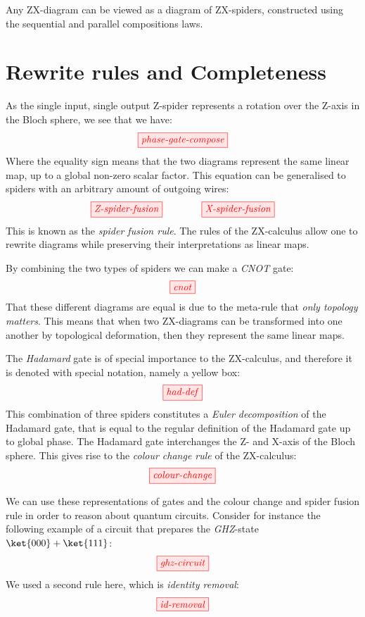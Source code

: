 \documentclass[a4paper, 12pt]{article}
\begin{document}
Any ZX-diagram can be viewed as a diagram of ZX-spiders, constructed using the
sequential and parallel compositions laws.



\section{Rewrite rules and Completeness}

As the single input, single output Z-spider represents a rotation over the Z-axis in the Bloch sphere, we see that we have:
\begin{equation*}
    \tikzfig{phase-gate-compose}
\end{equation*}
Where the equality sign means that the two diagrams represent the same linear map, up to a global non-zero scalar factor. This equation can be generalised to spiders with an arbitrary amount of outgoing wires:
\begin{equation*}
    \tikzfig{Z-spider-fusion} \qquad\qquad \tikzfig{X-spider-fusion}
\end{equation*}
This is known as the \emph{spider fusion rule}. The rules of the ZX-calculus allow one to rewrite diagrams while preserving their interpretations as linear maps.

By combining the two types of spiders we can make a \emph{CNOT} gate:
\begin{equation*}
    \tikzfig{cnot}
\end{equation*}
That these different diagrams are equal is due to the meta-rule that \emph{only topology matters}. This means that when two ZX-diagrams can be transformed into one another by topological deformation, then they represent the same linear maps.

The \emph{Hadamard} gate is of special importance to the ZX-calculus, and therefore it is denoted with special notation, namely a yellow box:
\begin{equation*}
    \tikzfig{had-def}
\end{equation*}
This combination of three spiders constitutes a \emph{Euler decomposition} of the Hadamard gate, that is equal to the regular definition of the Hadamard gate up to global phase. The Hadamard gate interchanges the Z- and X-axis of the Bloch sphere. This gives rise to the \emph{colour change rule} of the ZX-calculus:
\begin{equation*}
    \tikzfig{colour-change}
\end{equation*}

We can use these representations of gates and the colour change and spider fusion rule in order to reason about quantum circuits. Consider for instance the following example of a circuit that prepares the \emph{GHZ}-state $\ket{000}+\ket{111}$:
\begin{equation*}
    \tikzfig{ghz-circuit}
\end{equation*}
We used a second rule here, which is \emph{identity removal}:
\begin{equation*}
    \tikzfig{id-removal}
\end{equation*}
\end{document}
